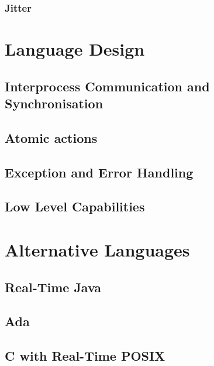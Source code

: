 \subsubsection{Jitter}

\section{Language Design}
\subsection{Interprocess Communication and Synchronisation}
\subsection{Atomic actions}
\subsection{Exception and Error Handling}
\subsection{Low Level Capabilities}

\section{Alternative Languages}
\subsection{Real-Time Java}
\subsection{Ada}
\subsection{C with Real-Time POSIX}
